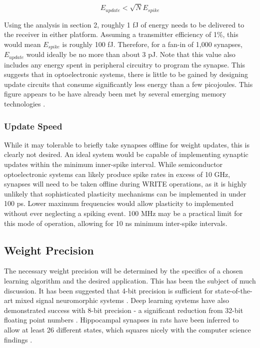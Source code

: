 \documentclass[twocolumn]{article}
\begin{document}
\begin{equation}
    E_{update} < \sqrt{N}E_{spike}
\end{equation}

Using the analysis in section 2, roughly 1 fJ of energy needs to be delivered to the receiver in either platform. Assuming a transmitter efficiency of 1\%, this would mean $E_{spike}$ is roughly 100 fJ. Therefore, for a fan-in of 1,000 synapses, $E_{update}$ would ideally be no more than about 3 pJ. Note that this value also includes any energy spent in peripheral circuitry to program the synapse. This suggests that in optoelectronic systems, there is little to be gained by designing update circuits that consume significantly less energy than a few picojoules. This figure appears to be have already been met by several emerging memory technologies \cite{zahoor2020resistive}.

\subsubsection{Update Speed}
While it may tolerable to briefly take synapses offline for weight updates, this is clearly not desired. An ideal system would be capable of implementing synaptic updates within the minimum inner-spike interval. While semiconductor optoelectronic systems can likely produce spike rates in excess of 10 GHz, synapses will need to be taken offline during WRITE operations, as it is highly unlikely that sophisticated plasticity mechanisms can be implemented in under 100 ps. Lower maximum frequencies would allow plasticity to implemented without ever neglecting a spiking event. 100 MHz may be a practical limit for this mode of operation, allowing for 10 ns minimum inter-spike intervals.

\subsection{Weight Precision}
The necessary weight precision will be determined by the specifics of a chosen learning algorithm and the desired application. This has been the subject of much discussion. It has been suggested that 4-bit precision is sufficient for state-of-the-art mixed signal neuromorphic systems \cite{pfeil20124}. Deep learning systems have also demonstrated success with 8-bit precision - a significant reduction from 32-bit floating point numbers \cite{wang2018training}. Hippocampal synapses in rats have been inferred to allow at least 26 different states, which squares nicely with the computer science findings \cite{bartol2015nanoconnectomic}. 
\end{document}
